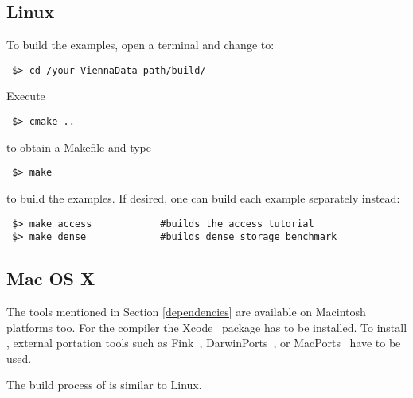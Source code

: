 \subsection{Linux}
To build the examples, open a terminal and change to:

\begin{lstlisting}
 $> cd /your-ViennaData-path/build/
\end{lstlisting}
Execute
\begin{lstlisting}
 $> cmake ..
\end{lstlisting}
to obtain a Makefile and type
\begin{lstlisting}
 $> make
\end{lstlisting}
to build the examples. If desired, one can build each example separately instead:
\begin{lstlisting}
 $> make access            #builds the access tutorial
 $> make dense             #builds dense storage benchmark
\end{lstlisting}


\subsection{Mac OS X}
\label{apple}
The tools mentioned in Section \ref{dependencies} are available on
Macintosh platforms too.
For the {\GCC} compiler the Xcode~\cite{xcode} package has to be installed.
To install {\CMake}, external portation tools such as
Fink~\cite{fink}, DarwinPorts~\cite{darwinports},
or MacPorts~\cite{macports} have to be used.

The build process of {\ViennaData} is similar to Linux.

